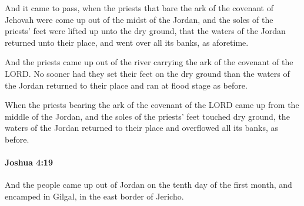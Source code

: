 			\begin{versebox}
					\item[BHS] 
					\item[ASV] And it came to pass, when the priests that bare the ark of the covenant of Jehovah were come up out of the midst of the Jordan, and the soles of the priests' feet were lifted up unto the dry ground, that the waters of the Jordan returned unto their place, and went over all its banks, as aforetime.
					\item[NIV] And the priests came up out of the river carrying the ark of the covenant of the LORD. No sooner had they set their feet on the dry ground than the waters of the Jordan returned to their place and ran at flood stage as before.
					\item[NRSV] When the priests bearing the ark of the covenant of the LORD came up from the middle of the Jordan, and the soles of the priests’ feet touched dry ground, the waters of the Jordan returned to their place and overflowed all its banks, as before.
			\end{versebox}

		\paragraph{Joshua 4:19} %
			\label{JOSHUA-4-19}

			And the people came up out of Jordan on the tenth day of the first month, and encamped in Gilgal, in the east border of Jericho.


